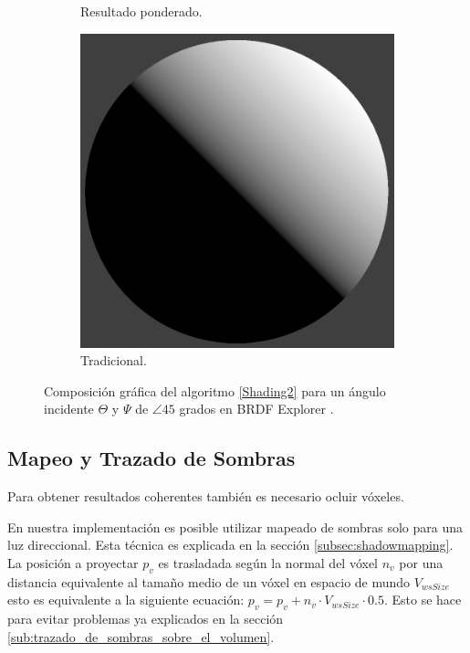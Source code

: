 \begin{figure}[H]
\begin{subfigure}[t]{0.2\textwidth}
		\caption*{Resultado ponderado.}
	\end{subfigure}%
	\begin{subfigure}[t]{0.2\textwidth}
		\centering
		\captionsetup{justification=centering}
		\includegraphics[width=\linewidth]{media/nDotLT.png}
		\caption*{Tradicional.}
	\end{subfigure}%
	\caption{Composición gráfica del algoritmo \ref{Shading2} para un ángulo incidente $\Theta$ y $\Psi$ de $\angle 45$ grados en BRDF Explorer \cite{brdf_explorer}.}
	\label{fig:compositve_vshading}
\end{figure}

\subsection{Mapeo y Trazado de Sombras}

Para obtener resultados coherentes también es necesario ocluir vóxeles. 

En nuestra implementación es posible utilizar mapeado de sombras solo para una luz direccional. Esta técnica es explicada en la sección \ref{subsec:shadowmapping}. La posición a proyectar $p_{v}$ es trasladada según la normal del vóxel $n_{v}$ por una distancia equivalente al tamaño medio de un vóxel en espacio de mundo $V_{wsSize}$ esto es equivalente a la siguiente ecuación: $p_{v} = p_{v} + n_{v}\cdot V_{wsSize} \cdot 0.5$. Esto se hace para evitar problemas ya explicados en la sección \ref{sub:trazado_de_sombras_sobre_el_volumen}.

